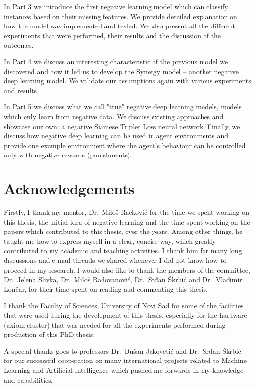 \documentclass[b5paper]{book}
\begin{document}
In Part 3 we introduce the first negative learning model which can classify instances based on their missing features. We provide detailed explanation on how the model was implemented and tested. We also present all the different experiments that were performed, their results and the discussion of the outcomes.

In Part 4 we discuss an interesting characteristic of the previous model we discovered and how it led us to develop the Synergy model -- another negative deep learning model. We validate our assumptions again with various experiments and results

In Part 5 we discuss what we call "true" negative deep learning models, models which only learn from negative data. We discuss existing approaches and showcase our own: a negative Siamese Triplet Loss neural network. Finally, we discuss how negative deep learning can be used in agent environments and provide one example environment where the agent's behaviour can be controlled only with negative rewards (punishments).

\section*{Acknowledgements}

Firstly, I thank my mentor, Dr.~Miloš Racković for the time we spent working on this thesis, the initial idea of negative learning and the time spent working on the papers which contributed to this thesis, over the years. Among other things, he taught me how to express myself in a clear, concise way, which greatly contributed to my academic and teaching activities. I thank him for many long discussions and e-mail threads we shared whenever I did not know how to proceed in my research. I would also like to thank the members of the committee, Dr.~Jelena Slivka, Dr.~Miloš Radovanović, Dr.~Srđan Škrbić and Dr.~Vladimir Lončar, for their time spent on reading and commenting this thesis.

I thank the Faculty of Sciences, University of Novi Sad for some of
the facilities that were used during the development of this thesis, especially for the hardware (axiom cluster) that was needed for all the experiments performed during production of this PhD thesis.

A special thanks goes to professors Dr.~Dušan Jakovetić and Dr.~Srđan Škrbić for our successful cooperation on many international projects related to Machine Learning and Artificial Intelligence which pushed me forwards in my knowledge and capabilities.
\end{document}
